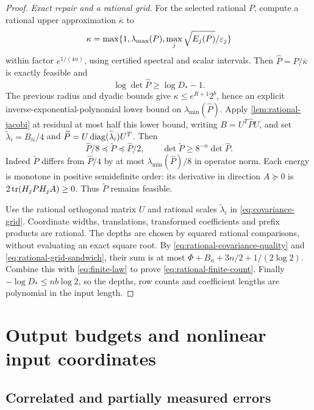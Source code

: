 \begin{proof}
\emph{Exact repair and a rational grid.} For the selected rational $P$,
compute a rational upper approximation $\overline\kappa$ to
\[
 \kappa=\max\{1,\lambda_{\max}(P),\max_j\sqrt{E_j(P)}/\varepsilon_j\}
\]
within factor $e^{1/(4n)}$, using certified spectral and scalar intervals.
Then $\widehat P=P/\overline\kappa$ is exactly feasible and
\begin{equation}\label{eq:rational-covariance-quality}
 \log\det\widehat P\ge\log D_*-1.
\end{equation}
The previous radius and dyadic bounds give
$\kappa\le e^{R+1}2^b$, hence an explicit inverse-exponential-polynomial
lower bound on $\lambda_{\min}(\widehat P)$.
Apply \cref{lem:rational-jacobi} at residual at most half this lower
bound, writing $B=U^T\widehat P U$, and set
$\widetilde\lambda_i=B_{ii}/4$ and
$\widetilde P=U\operatorname{diag}(\widetilde\lambda_i)U^T$. Then
\begin{equation}\label{eq:rational-grid-sandwich}
 \widehat P/8\preceq\widetilde P\preceq\widehat P/2,
 \qquad \det\widetilde P\ge8^{-n}\det\widehat P.
\end{equation}
Indeed $\widetilde P$ differs from $\widehat P/4$ by at most
$\lambda_{\min}(\widehat P)/8$ in operator norm. Each energy is monotone
in positive semidefinite order: its derivative in direction $A\succeq0$
is $2\operatorname{tr}(H_jPH_jA)\ge0$. Thus $\widetilde P$ remains feasible.

Use the rational orthogonal matrix $U$ and rational scales
$\widetilde\lambda_i$ in \eqref{eq:covariance-grid}. Coordinate widths,
translations, transformed coefficients and prefix products are rational.
The depths are chosen by squared rational comparisons, without evaluating
an exact square root. By \eqref{eq:rational-covariance-quality} and
\eqref{eq:rational-grid-sandwich}, their sum is at most
$\Phi+B_n+3n/2+1/(2\log2)$. Combine this with
\eqref{eq:finite-law} to prove \eqref{eq:rational-finite-count}.
Finally $-\log D_*\le nb\log2$, so the depths, row counts and coefficient
lengths are polynomial in the input length.
\end{proof}

\section{Output budgets and nonlinear input coordinates}\label{sec:quadratic-bodies}

\subsection{Correlated and partially measured errors}

